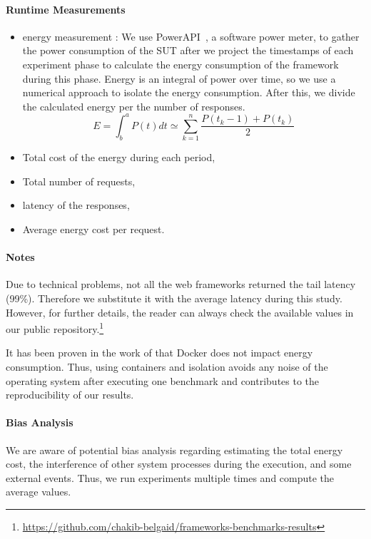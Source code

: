 \paragraph{Runtime Measurements}
\begin{itemize}
    \item energy measurement :
          We use PowerAPI~\cite{bourdon:hal-00772454}, a software power meter, to gather the power consumption of the SUT after we project the timestamps of each experiment phase to calculate the energy consumption of the framework during this phase.
          Energy is an integral of power over time, so we use a numerical approach to isolate the energy consumption.%
          After this, we divide the calculated energy per the number of responses.
          \begin{equation}
              E = \int^a_b P(t)dt \simeq \sum^n_{k=1} \frac{P(t_k-1)+P(t_k)}{2}
          \end{equation}
    \item Total cost of the energy during each period,
    \item Total number of requests,
    \item latency of the responses,
    \item Average energy cost per request.
\end{itemize}
\paragraph{Notes}
Due to technical problems, not all the web frameworks returned the tail latency (99\%). Therefore we substitute it with the average latency during this study.
However, for further details, the reader can always check the available values in our public repository.\footnote{\url{https://github.com/chakib-belgaid/frameworks-benchmarks-results}}


It has been proven in the work of \citeauthor{eddie_antonio_santos_how} that Docker does not impact energy consumption.
Thus, using containers and isolation avoids any noise of the operating system after executing one benchmark and contributes to the reproducibility of our results.

\paragraph{Bias Analysis}
We are aware of potential bias analysis regarding estimating the total energy cost, the interference of other system processes during the execution, and some external events.
Thus, we run experiments multiple times and compute the average values.

